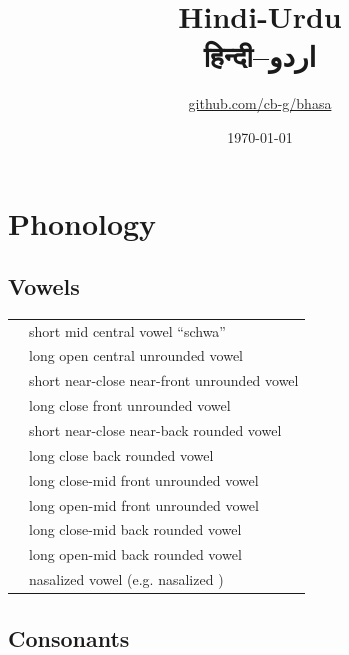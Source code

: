 \documentclass[12pt]{article}
\title{Hindi-Urdu\\{\devanagarifont हिन्दी}--{\nastaliqfont اردو}\\\ipa{["HIndi: "URdu:]}}
\author{\href{https://github.com/cb-g/bhasa}{github.com/cb-g/bhasa}}
\date{\today}
\begin{document}
\pagecolor{custom_bg}\color{custom_fg}
\maketitle\thispagestyle{empty}

\newpage\setcounter{page}{1}\section{Phonology}

\subsection{Vowels}

\begin{xltabular}{\textwidth}{lL}
   & short mid central vowel ``schwa'' \\
   & long open central unrounded vowel \\
   & short near-close near-front unrounded vowel \\
   & long close front unrounded vowel \\
   & short near-close near-back rounded vowel \\
   & long close back rounded vowel \\
   & long close-mid front unrounded vowel \\
   & long open-mid front unrounded vowel \\
   & long close-mid back rounded vowel \\
   & long open-mid back rounded vowel \\
   & nasalized vowel (e.g. nasalized ) \\
\end{xltabular}

\subsection{Consonants}
\end{document}
